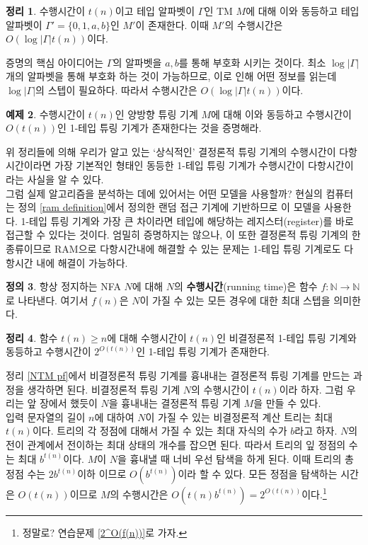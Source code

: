 \documentclass[b5paper, 11pt]{book}
\theoremstyle{definition}
\newtheorem{defn}{정의}[chapter]
\newtheorem{thm}[defn]{정리}
\newtheorem{ex}[defn]{예제}
\newenvironment{pf*}{\pushQED{\qed}\pf}
{\popQED\endpf}
\begin{document}
\begin{thm}
    수행시간이 $t(n)$이고 테입 알파벳이 $\Gamma$인 TM $M$에 대해 이와 동등하고 테입 알파벳이 $\Gamma' = \{0,1,a,b\}$인 $M'$이 존재한다. 이때 $M'$의 수행시간은 $O(\log\vert\Gamma\vert t(n))$이다. 
\end{thm}
\begin{pf*}
    증명의 핵심 아이디어는 $\Gamma$의 알파벳을 $a, b$를 통해 부호화 시키는 것이다. 최소 $\log \vert\Gamma\vert$개의 알파벳을 통해 부호화 하는 것이 가능하므로, 이로 인해 어떤 정보를 읽는데  $\log\vert\Gamma\vert$의 스텝이 필요하다. 따라서 수행시간은 $O(\log\vert\Gamma\vert t(n))$이다.
\end{pf*}
\begin{ex}
    수행시간이 $t(n)$인 양방향 튜링 기계 $M$에 대해 이와 동등하고 수행시간이 $O(t(n))$인 1-테입 튜링 기계가 존재한다는 것을 증명해라.
\end{ex}
위 정리들에 의해 우리가 알고 있는 `상식적인' 결정론적 튜링 기계의 수행시간이 다항시간이라면 가장 기본적인 형태인 동등한 1-테입 튜링 기계가 수행시간이 다항시간이라는 사실을 알 수 있다.\\ 
그럼 실제 알고리즘을 분석하는 데에 있어서는 어떤 모델을 사용할까? 현실의 컴퓨터는 정의 \ref{ram definition}에서 정의한 랜덤 접근 기계에 기반하므로 이 모델을 사용한다. 1-테입 튜링 기계와 가장 큰 차이라면 테입에 해당하는 레지스터(register)를 바로 접근할 수 있다는 것이다. 엄밀히 증명하지는 않으나, 이 또한 결정론적 튜링 기계의 한 종류이므로 RAM으로 다항시간내에 해결할 수 있는 문제는 1-테입 튜링 기계로도 다항시간 내에 해결이 가능하다.
\begin{defn}
    항상 정지하는 NFA $N$에 대해 $N$의 \textbf{수행시간}(running time)은 함수 $f: \mathbb{N}\rightarrow \mathbb{N}$로 나타낸다. 여기서 $f(n)$은 $N$이 가질 수 있는 모든 경우에 대한 최대 스텝을 의미한다. 
\end{defn}
\begin{thm}
    함수 $t(n) \ge n$에 대해 수행시간이 $t(n)$인 비결정론적 1-테입 튜링 기계와 동등하고 수행시간이 $2^{O(t(n))}$인 1-테입 튜링 기계가 존재한다. 
\end{thm}
\begin{pf*}
    정리 \ref{NTM pf}에서 비결정론적 튜링 기계를 흉내내는 결정론적 튜링 기계를 만드는 과정을 생각하면 된다. 비결정론적 튜링 기계 $N$의 수행시간이 $t(n)$이라 하자. 그럼 우리는 앞 장에서 했듯이 $N$을 흉내내는 결정론적 튜링 기계 $M$을 만들 수 있다. \\ 
    입력 문자열의 길이 $n$에 대하여 $N$이 가질 수 있는 비결정론적 계산 트리는 최대 $t(n)$이다. 트리의 각 정점에 대해서 가질 수 있는 최대 자식의 수가 $b$라고 하자. $N$의 전이 관계에서 전이하는 최대 상태의 개수를 잡으면 된다. 따라서 트리의 잎 정점의 수는 최대 $b^{t(n)}$이다. $M$이 $N$을 흉내낼 때 너비 우선 탐색을 하게 된다. 이때 트리의 총 정점 수는 $2b^{t(n)}$이하 이므로 $O(b^{t(n)})$이라 할 수 있다. 모든 정점을 탐색하는 시간은 $O(t(n))$이므로 $M$의 수행시간은 $O(t(n)b^{t(n)}) = 2^{O(t(n))}$이다.\footnote{정말로? 연습문제 \ref{2^O(f(n))}로 가자.}
\end{pf*}
\end{document}

